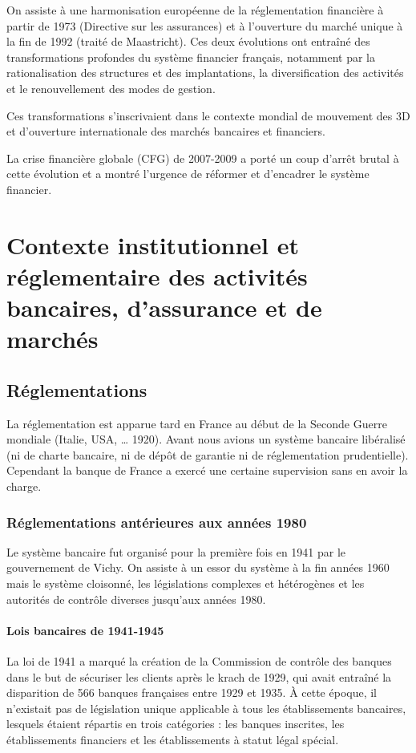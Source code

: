 \documentclass[a4paper, 12pt]{report}
\begin{document}
On assiste à une harmonisation européenne de la réglementation financière à partir de 1973 (Directive sur les assurances) et à l'ouverture du marché unique à la fin de 1992 (traité de Maastricht). Ces deux évolutions ont entraîné des transformations profondes du système financier français, notamment par la rationalisation des structures et des implantations, la diversification des activités et le renouvellement des modes de gestion.

Ces transformations s’inscrivaient dans le contexte mondial de mouvement des 3D et d’ouverture internationale des marchés bancaires et financiers.

La crise financière globale (CFG) de 2007-2009 a porté un coup d’arrêt brutal à cette évolution et a montré l’urgence de réformer et d’encadrer le système
financier. 

\section{Contexte institutionnel et réglementaire des activités bancaires, d’assurance et de marchés}

\subsection{Réglementations}

La réglementation est apparue tard en France au début de la Seconde Guerre mondiale (Italie, USA, … 1920). Avant nous avions un système bancaire libéralisé (ni de charte bancaire, ni de dépôt de garantie ni de réglementation prudentielle). Cependant la banque de France a exercé une certaine supervision sans en avoir la charge.

\subsubsection{Réglementations antérieures aux années 1980}

Le système bancaire fut organisé pour la première fois en 1941 par le
gouvernement de Vichy. On assiste à un essor du système à la fin années 1960 mais le système cloisonné, les législations complexes et hétérogènes et les 
autorités de contrôle diverses jusqu’aux années 1980. 

\paragraph{Lois bancaires de 1941-1945}

La loi de 1941 a marqué la création de la Commission de contrôle des banques dans le but de sécuriser les clients après le krach de 1929, qui avait entraîné la disparition de 566 banques françaises entre 1929 et 1935. À cette époque, il n'existait pas de législation unique applicable à tous les établissements bancaires, lesquels étaient répartis en trois catégories : les banques inscrites, les établissements financiers et les établissements à statut légal spécial. 
\end{document}
